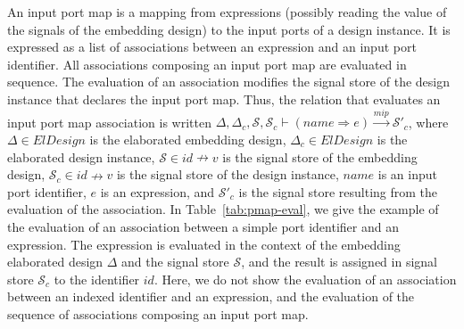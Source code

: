 \begin{table}[!h]


\end{table}

An input port map is a mapping from expressions (possibly reading the
value of the signals of the embedding design) to the input ports of a
design instance. It is expressed as a list of associations between an
expression and an input port identifier.  All associations composing
an input port map are evaluated in sequence.  The evaluation of an
association modifies the signal store of the design instance that
declares the input port map. Thus, the relation that evaluates an
input port map association is written
$\Delta,\Delta_c,\mathcal{S},\mathcal{S}_c\vdash{}(name\Rightarrow{}e)\xrightarrow{mip}\mathcal{S}'_c$,
where $\Delta\in{}ElDesign$ is the elaborated embedding design,
$\Delta_c\in{}ElDesign$ is the elaborated design instance,
$\mathcal{S}\in{}id\nrightarrow{}v$ is the signal store of the
embedding design, $\mathcal{S}_c\in{}id\nrightarrow{}v$ is the signal
store of the design instance, $name$ is an input port identifier, $e$
is an expression, and $\mathcal{S}'_c$ is the signal store resulting
from the evaluation of the association. In Table~\ref{tab:pmap-eval},
we give the example of the evaluation of an association between a
simple port identifier and an expression. The expression is evaluated
in the context of the embedding elaborated design $\Delta$ and the
signal store $\mathcal{S}$, and the result is assigned in signal store
$\mathcal{S}_c$ to the identifier $id$. Here, we do not show the
evaluation of an association between an indexed identifier and an
expression, and the evaluation of the sequence of associations
composing an input port map.

